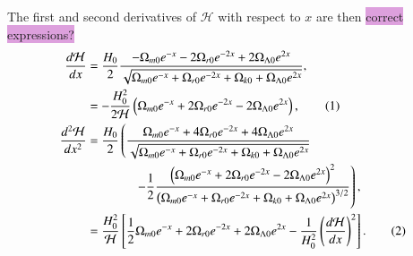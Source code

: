 \documentclass{aa}
\newcommand\numberthis{\addtocounter{equation}{1}\tag{\theequation}}
\begin{document}
The first and second derivatives of $\mathcal{H}$ with respect to $x$ are then \colorbox{Plum}{correct expressions?}
\begin{align*}
  \frac{d\mathcal{H}}{dx} &= \frac{H_0}{2}
  \frac{-\Omega_{m0}e^{-x} - 2\Omega_{r0}e^{-2x} + 2\Omega_{\Lambda0}e^{2x}}
  {\sqrt{\Omega_{m0}e^{-x} 
  + \Omega_{r0}e^{-2x}
  + \Omega_{k0} + \Omega_{\Lambda0}e^{2x}}},
  \\
  &= -\frac{H_0^2}{2\mathcal{H}}\left(\Omega_{m0}e^{-x} + 2\Omega_{r0}e^{-2x} - 2\Omega_{\Lambda0}e^{2x}\right), \numberthis
  \\
  \frac{d^2\mathcal{H}}{dx^2} &= \frac{H_0}{2}
  \left(\frac{\Omega_{m0}e^{-x} + 4\Omega_{r0}e^{-2x} + 4\Omega_{\Lambda0}e^{2x}}{\sqrt{\Omega_{m0}e^{-x} + \Omega_{r0}e^{-2x} + \Omega_{k0} + \Omega_{\Lambda0}e^{2x}}}\right.
  \\
  &\hspace{38pt}
  \left.- \frac{1}{2}\frac{\left(\Omega_{m0}e^{-x} + 2\Omega_{r0}e^{-2x} - 2\Omega_{\Lambda0}e^{2x}\right)^2}{\left(\Omega_{m0}e^{-x} + \Omega_{r0}e^{-2x} + \Omega_{k0} + \Omega_{\Lambda0}e^{2x}\right)^{3/2}}\right),
  \\
  &= \frac{H_0^2}{\mathcal{H}}\left[\frac{1}{2}\Omega_{m0}e^{-x} + 2\Omega_{r0}e^{-2x} + 2\Omega_{\Lambda0}e^{2x}- \frac{1}{H_0^2}\left(\frac{d\mathcal{H}}{dx}\right)^2\right]. \numberthis
\end{align*}
\end{document}
